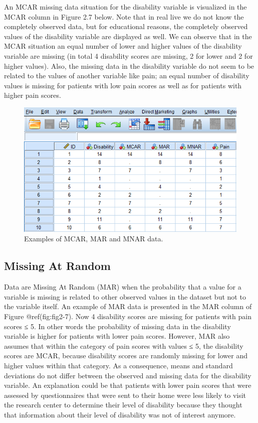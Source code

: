 \documentclass[
]{book}
\begin{document}
An MCAR missing data situation for the disability variable is visualized
in the MCAR column in Figure 2.7 below. Note that in real live we do not
know the completely observed data, but for educational reasons, the
completely observed values of the disability variable are displayed as
well. We can observe that in the MCAR situation an equal number of lower
and higher values of the disability variable are missing (in total 4
disability scores are missing, 2 for lower and 2 for higher values).
Also, the missing data in the disability variable do not seem to be
related to the values of another variable like pain; an equal number of
disability values is missing for patients with low pain scores as well
as for patients with higher pain scores.

\begin{figure}

{\centering \includegraphics[width=0.9\linewidth]{images/fig2.7} 

}

\caption{Examples of MCAR, MAR and MNAR data.}\label{fig:fig2-7}
\end{figure}

\hypertarget{missing-at-random}{%
\subsection{Missing At Random}\label{missing-at-random}}

Data are Missing At Random (MAR) when the probability that a value for a
variable is missing is related to other observed values in the dataset
but not to the variable itself. An example of MAR data is presented in
the MAR column of Figure @ref(fig:fig2-7). Now 4 disability scores are
missing for patients with pain scores ≤ 5. In other words the
probability of missing data in the disability variable is higher for
patients with lower pain scores. However, MAR also assumes that within
the category of pain scores with values ≤ 5, the disability scores are
MCAR, because disability scores are randomly missing for lower and
higher values within that category. As a consequence, means and standard
deviations do not differ between the observed and missing data for the
disability variable. An explanation could be that patients with lower
pain scores that were assessed by questionnaires that were sent to their
home were less likely to visit the research center to determine their
level of disability because they thought that information about their
level of disability was not of interest anymore.
\end{document}
